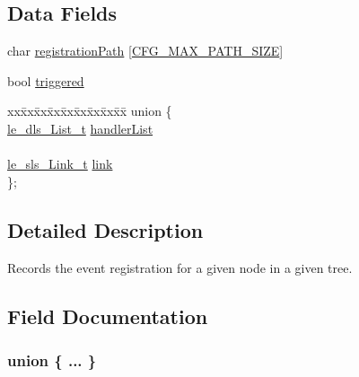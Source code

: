 \subsection*{Data Fields}
\begin{DoxyCompactItemize}
\item 
char \hyperlink{struct_registration__t_ab5751741b6ecdd12a64e99cc94033e3e}{registration\+Path} \mbox{[}\hyperlink{tree_db_8c_a1d2150932161254475a1d66bb3f4b283}{C\+F\+G\+\_\+\+M\+A\+X\+\_\+\+P\+A\+T\+H\+\_\+\+S\+I\+ZE}\mbox{]}
\item 
bool \hyperlink{struct_registration__t_a8634db3533765fee7ab0f75872c9b4a6}{triggered}
\item 
\begin{tabbing}
xx\=xx\=xx\=xx\=xx\=xx\=xx\=xx\=xx\=\kill
union \{\\
\>\hyperlink{structle__dls___list__t}{le\_dls\_List\_t} \hyperlink{struct_registration__t_a0d251cb49e76d015d146f02326bfde0f}{handlerList}\\
\>\\
\>\hyperlink{structle__sls___link__t}{le\_sls\_Link\_t} \hyperlink{struct_registration__t_a4f570436979868525897c75a16f8ca32}{link}\\
\}; \\

\end{tabbing}\end{DoxyCompactItemize}


\subsection{Detailed Description}
Records the event registration for a given node in a given tree. 

\subsection{Field Documentation}
\subsubsection[{\texorpdfstring{"@9}{@9}}]{\setlength{\rightskip}{0pt plus 5cm}union \{ ... \} }\hypertarget{struct_registration__t_ac991284a2e30746ed15563c1931e945f}{}\label{struct_registration__t_ac991284a2e30746ed15563c1931e945f}
